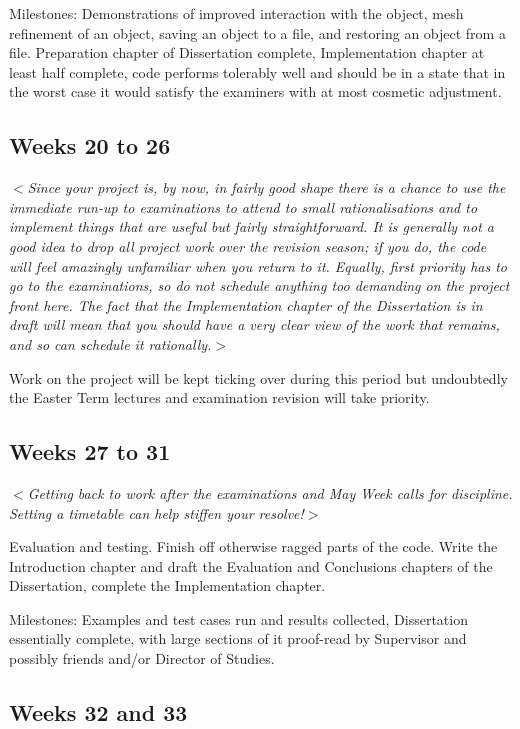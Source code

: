 \documentclass[12pt]{article}
\newcommand{\al}{$<$}
\newcommand{\ar}{$>$}
\begin{document}
Milestones: Demonstrations of improved interaction with the object,
mesh refinement of an object, saving an object to a file, and
restoring an object from a file.  Preparation chapter of Dissertation
complete, Implementation chapter at least half complete, code performs
tolerably well and should be in a state that in the worst case it
would satisfy the examiners with at most cosmetic adjustment.


\subsection*{Weeks 20 to 26}

\al\emph{Since your project is, by now, in fairly good shape there is
  a chance to use the immediate run-up to examinations to attend to
  small rationalisations and to implement things that are useful but
  fairly straightforward.  It is generally not a good idea to drop all
  project work over the revision season; if you do, the code will feel
  amazingly unfamiliar when you return to it.  Equally, first priority
  has to go to the examinations, so do not schedule anything too
  demanding on the project front here.  The fact that the
  Implementation chapter of the Dissertation is in draft will mean
  that you should have a very clear view of the work that remains, and
  so can schedule it rationally.}\ar

Work on the project will be kept ticking over during this period but
undoubtedly the Easter Term lectures and examination revision will
take priority.


\subsection*{Weeks 27 to 31}

\al\emph{Getting back to work after the examinations and May Week
  calls for discipline.  Setting a timetable can help stiffen your
  resolve!}\ar

Evaluation and testing.  Finish off otherwise ragged parts of the
code.  Write the Introduction chapter and draft the Evaluation and
Conclusions chapters of the Dissertation, complete the Implementation
chapter.

Milestones: Examples and test cases run and results collected,
Dissertation essentially complete, with large sections of it
proof-read by Supervisor and possibly friends and/or Director of
Studies.


\subsection*{Weeks 32 and 33}
\end{document}
